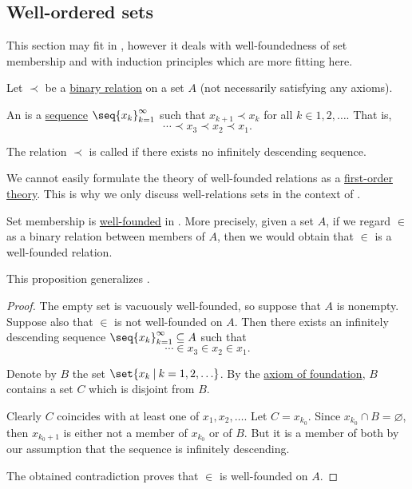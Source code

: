 \subsection{Well-ordered sets}\label{subsec:well_ordered_sets}

This section may fit in , however it deals with well-foundedness of set membership and with induction principles which are more fitting here.

\begin{definition}\label{def:well_founded_relation}
  Let \( \prec \) be a \hyperref[def:binary_relation]{binary relation} on a set \( A \) (not necessarily satisfying any axioms).

  An  is a \hyperref[def:sequence]{sequence} \( \seq{ x_k }_{k=1}^\infty \) such that \( x_{k+1} \prec x_k \) for all \( k \in 1, 2, \ldots \). That is,
  \begin{equation*}
    \cdots \prec x_3 \prec x_2 \prec x_1.
  \end{equation*}

  The relation \( \prec \) is called  if there exists no infinitely descending sequence.

  We cannot easily formulate the theory of well-founded relations as a \hyperref[def:first_order_theory]{first-order theory}. This is why we only discuss well-relations sets in the context of .
\end{definition}

\begin{proposition}\label{thm:set_membership_is_well_founded}
  Set membership is \hyperref[def:well_founded_relation]{well-founded} in . More precisely, given a set \( A \), if we regard \( \in \) as a binary relation between members of \( A \), then we would obtain that \( \in \) is a well-founded relation.

  This proposition generalizes .
\end{proposition}
\begin{proof}
  The empty set is vacuously well-founded, so suppose that \( A \) is nonempty. Suppose also that \( \in \) is not well-founded on \( A \). Then there exists an infinitely descending sequence \( \seq{ x_k }_{k=1}^\infty \subseteq A \) such that
  \begin{equation*}
    \cdots \in x_3 \in x_2 \in x_1.
  \end{equation*}

  Denote by \( B \) the set \( \set{ x_k \given k = 1, 2, \ldots } \). By the \hyperref[def:zfc/foundation]{axiom of foundation}, \( B \) contains a set \( C \) which is disjoint from \( B \).

  Clearly \( C \) coincides with at least one of \( x_1, x_2, \ldots \). Let \( C = x_{k_0} \). Since \( x_{k_0} \cap B = \varnothing \), then \( x_{k_0 + 1} \) is either not a member of \( x_{k_0} \) or of \( B \). But it is a member of both by our assumption that the sequence is infinitely descending.

  The obtained contradiction proves that \( \in \) is well-founded on \( A \).
\end{proof}

